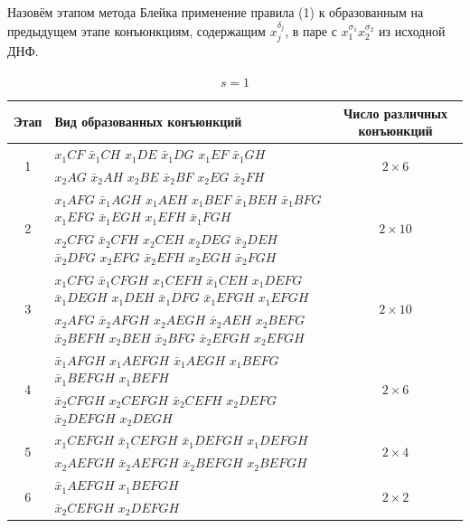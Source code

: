 \documentclass[12pt,a4paper,oneside,fleqn,leqno]{article}
\theoremstyle{definition}
\begin{document}
			Назовём этапом метода Блейка применение правила (1) к образованным на предыдущем этапе конъюнкциям, содержащим $x_j^{\delta_j}$, в паре с $x_1^{\sigma_1}x_2^{\sigma_2}$ из исходной ДНФ.
			\begin{table}[H]
				\centering
				\begin{tabular}{|c|p{4in}|c|}
					\hline
					Этап & Вид образованных конъюнкций & Число различных конъюнкций\\
					\hline
					\multirow{2}{*}{1} & $x_1CF$ $\bar{x}_1CH$ $x_1DE$ $\bar{x}_1DG$ $x_1EF$ $\bar{x}_1GH$ \vspace{5pt}& \multirow{2}{*}{$2 \times 6$}\\
					&$x_2AG$ $\bar{x}_2AH$ $x_2BE$ $\bar{x}_2BF$ $x_2EG$ $\bar{x}_2FH$&\\
					\hline
					\multirow{2}{*}{2} & $x_1AFG$ $\bar{x}_1AGH$ $x_1AEH$ $x_1BEF$ $\bar{x}_1BEH$ $\bar{x}_1BFG$ $x_1EFG$ $\bar{x}_1EGH$ $x_1EFH$ $\bar{x}_1FGH$ \vspace{5pt} & \multirow{2}{*}{$2 \times 10$}\\
					&$x_2CFG$ $\bar{x}_2CFH$ $x_2CEH$ $x_2DEG$ $\bar{x}_2DEH$ $\bar{x}_2DFG$ $x_2EFG$ $\bar{x}_2EFH$ $x_2EGH$ $\bar{x}_2FGH$&\\
					\hline
					\multirow{2}{*}{3} & $x_1CFG$ $\bar{x}_1CFGH$ $x_1CEFH$ $\bar{x}_1CEH$ $x_1DEFG$ $\bar{x}_1DEGH$ $x_1DEH$ $\bar{x}_1DFG$ $\bar{x}_1EFGH$ $x_1EFGH$\vspace{5pt} & \multirow{2}{*}{$2 \times 10$}\\
					&$x_2AFG$ $\bar{x}_2AFGH$ $x_2AEGH$ $\bar{x}_2AEH$ $x_2BEFG$ $\bar{x}_2BEFH$ $x_2BEH$ $\bar{x}_2BFG$ $\bar{x}_2EFGH$ $x_2EFGH$&\\
					\hline
					\multirow{2}{*}{4} & $\bar{x}_1AFGH$ $x_1AEFGH$ $\bar{x}_1AEGH$ $x_1BEFG$ $\bar{x}_1BEFGH$ $x_1BEFH$ \vspace{5pt} & \multirow{2}{*}{$2 \times 6$}\\
					&$\bar{x}_2CFGH$ $x_2CEFGH$ $\bar{x}_2CEFH$ $x_2DEFG$ $\bar{x}_2DEFGH$ $x_2DEGH$&\\
					\hline
					\multirow{2}{*}{5} & $x_1CEFGH$ $\bar{x}_1CEFGH$ $\bar{x}_1DEFGH$ $x_1DEFGH$ \vspace{5pt} & \multirow{2}{*}{$2 \times 4$}\\
					&$x_2AEFGH$ $\bar{x}_2AEFGH$ $\bar{x}_2BEFGH$ $x_2BEFGH$&\\
					\hline
					\multirow{2}{*}{6} & $\bar{x}_1AEFGH$ $x_1BEFGH$ \vspace{5pt} & \multirow{2}{*}{$2 \times 2$}\\
					&$\bar{x}_2CEFGH$ $x_2DEFGH$ &\\
					\hline
				\end{tabular}
				\caption{$s = 1$}
			\end{table}\par
\end{document}
